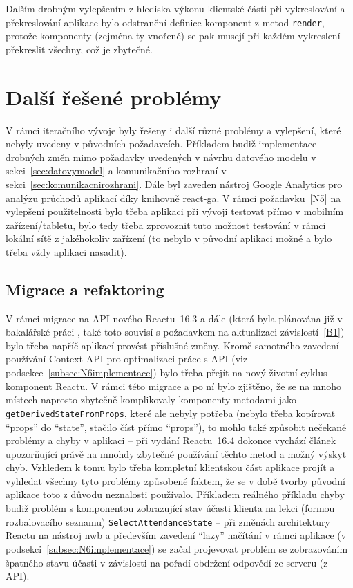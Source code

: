 Dalším drobným vylepšením z hlediska výkonu klientské části při vykreslování a překreslování aplikace bylo odstranění definice komponent z metod \verb|render|, protože komponenty (zejména ty vnořené) se pak musejí při každém vykreslení překreslit všechny, což je zbytečné.

\section{Další řešené problémy}\label{sec:dalsireseneproblemy}

V rámci iteračního vývoje byly řešeny i další různé problémy a vylepšení, které nebyly uvedeny v původních požadavcích. Příkladem budiž implementace drobných změn mimo požadavky uvedených v návrhu datového modelu v sekci~\ref{sec:datovymodel} a komunikačního rozhraní v sekci~\ref{sec:komunikacnirozhrani}. Dále byl zaveden nástroj Google Analytics pro analýzu průchodů aplikací díky knihovně \href{https://github.com/react-ga/react-ga}{react-ga}. V rámci požadavku~\ref{N5} na vylepšení použitelnosti bylo třeba aplikaci při vývoji testovat přímo v mobilním zařízení/tabletu, bylo tedy třeba zprovoznit tuto možnost testování v rámci lokální sítě z jakéhokoliv zařízení (to nebylo v původní aplikaci možné a bylo třeba vždy aplikaci nasadit).

\subsection{Migrace a refaktoring}
V rámci migrace na API nového Reactu~16.3 a dále (která byla plánována již v bakalářské práci \cite{bp}, také toto souvisí s požadavkem na aktualizaci závislostí~\ref{B1}) bylo třeba napříč aplikací provést příslušné změny. Kromě samotného zavedení používání Context API pro optimalizaci práce s API (viz podsekce~\ref{subsec:N6implementace}) bylo třeba přejít na nový životní cyklus komponent Reactu. V rámci této migrace a po ní bylo zjištěno, že se na mnoho místech naprosto zbytečně komplikovaly komponenty metodami jako \verb|getDerivedStateFromProps|, které ale nebyly potřeba (nebylo třeba kopírovat \enquote{props} do \enquote{state}, stačilo číst přímo \enquote{props}), to mohlo také způsobit nečekané problémy a chyby v aplikaci -- při vydání Reactu~16.4 dokonce vychází článek \cite{react-blog-derivedstate} upozorňující právě na mnohdy zbytečné používání těchto metod a možný výskyt chyb. Vzhledem k tomu bylo třeba kompletní klientskou část aplikace projít a vyhledat všechny tyto problémy způsobené faktem, že se v době tvorby původní aplikace toto z důvodu neznalosti používalo. Příkladem reálného příkladu chyby budiž problém s komponentou zobrazující stav účasti klienta na lekci (formou rozbalovacího seznamu) \verb|SelectAttendanceState| -- při změnách architektury Reactu na nástroj nwb a především zavedení \enquote{lazy} načítání v rámci aplikace (v podsekci~\ref{subsec:N6implementace}) se začal projevovat problém se zobrazováním špatného stavu účasti v závislosti na pořadí obdržení odpovědí ze serveru (z API).

